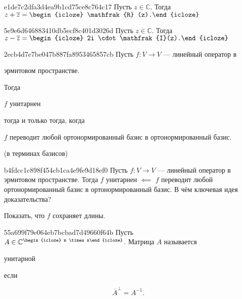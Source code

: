 \begin{note}{e1de7c2dfa3d4ea9b1cd75ce8c764c17}
    Пусть \({ z \in \mathbb C }\).
    Тогда \({ z + \overline{z} = \begin{icloze}{1}\mathfrak{R} (z).\end{icloze} }\)
\end{note}

\begin{note}{5e9e6d646883410db5ecf8c401d3026d}
    Пусть \({ z \in \mathbb C }\).
    Тогда \({ z - \overline{z} = \begin{icloze}{1}2i \cdot \mathfrak{I}(z).\end{icloze} }\)
\end{note}

\begin{note}{2ecb4d7e7be047b887fa8953465857cb}
    Пусть \({ f : V \to V }\) --- линейный оператор в \begin{icloze}{3}эрмитовом пространстве.\end{icloze}
    Тогда \begin{icloze}{2}\({ f }\) унитарнен\end{icloze} тогда и только тогда, когда
    \begin{icloze}{1}\({ f }\) переводит любой ортонормированный базис в ортонормированный базис.\end{icloze}

    \begin{center}
        \tiny
        (в терминах базисов)
    \end{center}
\end{note}

\begin{note}{b4fdcc1c898f454cb1ca4e9fe9d18ef0}
    Пусть \({ f : V \to V }\) --- линейный оператор в эрмитовом пространстве.
    Тогда \({ f }\) унитарнен \({ \impliedby }\)
    \({ f }\) переводит любой ортонормированный базис в ортонормированный базис.
    В чём ключевая идея доказательства?

    \begin{cloze}{1}
        Показать, что \({ f }\) сохраняет длины.
    \end{cloze}
\end{note}

\begin{note}{55a699f79e064eb7bcbad7d49660f64b}
    Пусть \({ A \in \mathbb C^{\begin{icloze}{3}n \times n\end{icloze}} }\).
    Матрица \({ A }\) называется \begin{icloze}{2}унитарной\end{icloze} если
    \begin{icloze}{1}
        \[
            \overline{A}^{\perp} = A^{-1}.
        \]
    \end{icloze}
\end{note}

